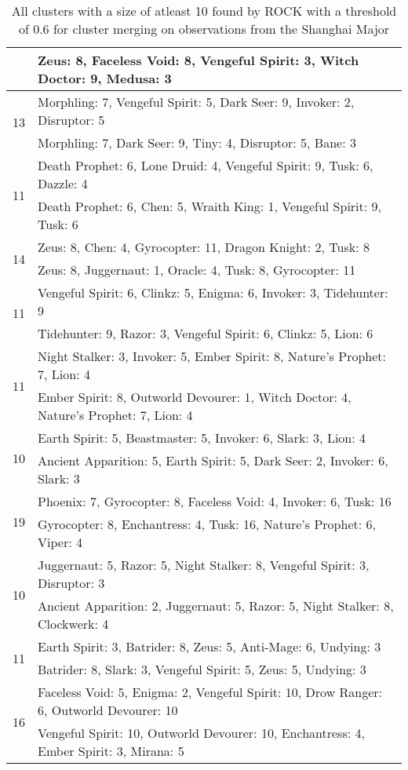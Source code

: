 \documentclass[result.tex]{subfiles}
\begin{document}
\begin{table}[H]
\begin{tabular}{ | c | p{12.5cm} | }
    & Zeus: 8, Faceless Void: 8, Vengeful Spirit: 3, Witch Doctor: 9, Medusa: 3 \\
    \hline
    \multirow{2}{*}{13}
    & Morphling: 7, Vengeful Spirit: 5, Dark Seer: 9, Invoker: 2, Disruptor: 5 \\
    & Morphling: 7, Dark Seer: 9, Tiny: 4, Disruptor: 5, Bane: 3 \\
    \hline
    \multirow{2}{*}{11}
    & Death Prophet: 6, Lone Druid: 4, Vengeful Spirit: 9, Tusk: 6, Dazzle: 4 \\
    & Death Prophet: 6, Chen: 5, Wraith King: 1, Vengeful Spirit: 9, Tusk: 6 \\
    \hline
    \multirow{2}{*}{14}
    & Zeus: 8, Chen: 4, Gyrocopter: 11, Dragon Knight: 2, Tusk: 8 \\
    & Zeus: 8, Juggernaut: 1, Oracle: 4, Tusk: 8, Gyrocopter: 11 \\
    \hline
    \multirow{2}{*}{11}
    & Vengeful Spirit: 6, Clinkz: 5, Enigma: 6, Invoker: 3, Tidehunter: 9 \\
    & Tidehunter: 9, Razor: 3, Vengeful Spirit: 6, Clinkz: 5, Lion: 6 \\
    \hline
    \multirow{2}{*}{11}
    & Night Stalker: 3, Invoker: 5, Ember Spirit: 8, Nature's Prophet: 7, Lion: 4 \\
    & Ember Spirit: 8, Outworld Devourer: 1, Witch Doctor: 4, Nature's Prophet: 7, Lion: 4 \\
    \hline
    \multirow{2}{*}{10}
    & Earth Spirit: 5, Beastmaster: 5, Invoker: 6, Slark: 3, Lion: 4 \\
    & Ancient Apparition: 5, Earth Spirit: 5, Dark Seer: 2, Invoker: 6, Slark: 3 \\
    \hline
    \multirow{2}{*}{19}
    & Phoenix: 7, Gyrocopter: 8, Faceless Void: 4, Invoker: 6, Tusk: 16 \\
    & Gyrocopter: 8, Enchantress: 4, Tusk: 16, Nature's Prophet: 6, Viper: 4 \\
    \hline
    \multirow{2}{*}{10}
    & Juggernaut: 5, Razor: 5, Night Stalker: 8, Vengeful Spirit: 3, Disruptor: 3 \\
    & Ancient Apparition: 2, Juggernaut: 5, Razor: 5, Night Stalker: 8, Clockwerk: 4 \\
    \hline
    \multirow{2}{*}{11}
    & Earth Spirit: 3, Batrider: 8, Zeus: 5, Anti-Mage: 6, Undying: 3 \\
    & Batrider: 8, Slark: 3, Vengeful Spirit: 5, Zeus: 5, Undying: 3 \\
    \hline
    \multirow{2}{*}{16}
    & Faceless Void: 5, Enigma: 2, Vengeful Spirit: 10, Drow Ranger: 6, Outworld Devourer: 10 \\
    & Vengeful Spirit: 10, Outworld Devourer: 10, Enchantress: 4, Ember Spirit: 3, Mirana: 5 \\
    \hline
  \end{tabular}
  \caption{All clusters with a size of atleast 10 found by ROCK with a threshold of 0.6 for cluster merging on observations from the Shanghai Major}
  \label{tab:cl_app_shanghai_rock_all}
\end{table}
\end{document}
